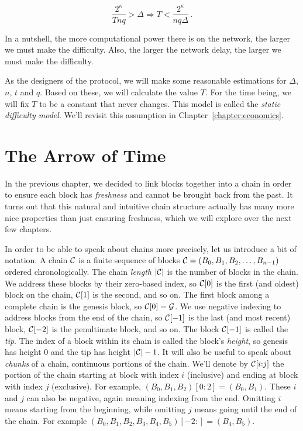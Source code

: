 \[
  \frac{2^\kappa}{Tnq} > \Delta \Rightarrow T < \frac{2^\kappa}{nq\Delta}\,.
\]

In a nutshell, the more computational power there is on the network, the larger we must make the difficulty.
Also, the larger the network delay, the larger we must make the difficulty.

As the designers of the protocol, we will make some reasonable estimations for $\Delta$, $n$, $t$ and $q$.
Based on these, we will calculate the value $T$. For the time being, we will fix $T$ to be a constant
that never changes. This model is called the \emph{static difficulty model}. We'll revisit this assumption
in Chapter~\ref{chapter:economics}.

\section{The Arrow of Time}

In the previous chapter, we decided to link blocks together into a chain in order to ensure each block
has \emph{freshness} and cannot be brought back from the past. It turns out that this natural and
intuitive chain structure actually has many more nice properties than just ensuring freshness, which
we will explore over the next few chapters.

In order to be able to speak about chains more precisely,
let us introduce a bit of notation. A chain $\mathcal{C}$ is a finite sequence of blocks
$\mathcal{C} = (B_0, B_1, B_2, \ldots, B_{n-1})$ ordered chronologically.
The chain \emph{length} $|\mathcal{C}|$ is the number of blocks in the chain.
We address these blocks by their zero-based index,
so $\mathcal{C}[0]$ is the first (and oldest) block on the chain, $\mathcal{C}[1]$ is the second, and so on.
The first block among a complete chain is the genesis block, so $\mathcal{C}[0] = \mathcal{G}$.
We use negative indexing to address blocks from the end of the chain, so $\mathcal{C}[-1]$
is the last (and most recent) block, $\mathcal{C}[-2]$ is the penultimate block, and so on.
The block $\mathcal{C}[-1]$ is called the \emph{tip}.
The index of a block within its chain is called the block's \emph{height},
so genesis has height $0$ and the tip has height $|\mathcal{C}| - 1$.
It will also be useful to speak about \emph{chunks} of a chain, continuous portions
of the chain. We'll denote by $\mathcal{C}[i{:}j]$ the portion of the chain starting at block
with index $i$ (inclusive) and ending at block with index $j$ (exclusive). For example,
$(B_0, B_1, B_2)[0:2] = (B_0, B_1)$. These $i$ and $j$ can also be negative, again meaning
indexing from the end. Omitting $i$ means starting from the beginning, while
omitting $j$ means going until the end of the chain. For example
$(B_0, B_1, B_2, B_3, B_4, B_5)[-2:] = (B_4, B_5)$.

